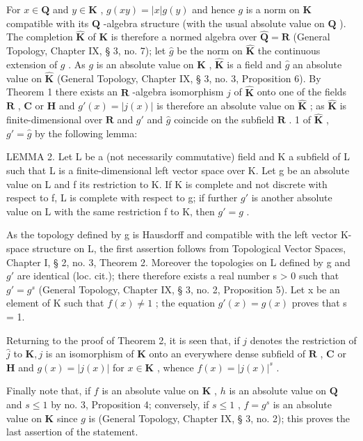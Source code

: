 For \(x \in \mathbf{Q}\) and \(y \in \mathbf{K}\) , \(g(xy) = |x|g(y)\) and hence \(g\) is a norm on \(\mathbf{K}\) compatible with its \(\mathbf{Q}\) -algebra structure (with the usual absolute value on \(\mathbf{Q}\) ). The completion \(\hat{\mathbf{K}}\) of \(\mathbf{K}\) is therefore a normed algebra over \(\hat{\mathbf{Q}} = \mathbf{R}\) (General Topology, Chapter IX, § 3, no. 7); let \(\hat{g}\) be the norm on \(\hat{\mathbf{K}}\) the continuous extension of \(g\) . As \(g\) is an absolute value on \(\mathbf{K}\) , \(\hat{\mathbf{K}}\) is a field and \(\hat{g}\) an absolute value on \(\hat{\mathbf{K}}\) (General Topology, Chapter IX, § 3, no. 3, Proposition 6). By Theorem 1 there exists an \(\mathbf{R}\) -algebra isomorphism \(j\) of \(\hat{\mathbf{K}}\) onto one of the fields \(\mathbf{R}\) , \(\mathbf{C}\) or \(\mathbf{H}\) and \(g'(x) = |j(x)|\) is therefore an absolute value on \(\hat{\mathbf{K}}\) ; as \(\hat{\mathbf{K}}\) is finite-dimensional over \(\mathbf{R}\) and \(g'\) and \(\hat{g}\) coincide on the subfield \(\mathbf{R}\) . 1 of \(\hat{\mathbf{K}}\) , \(g' = \hat{g}\) by the following lemma:

LEMMA 2. Let L be a (not necessarily commutative) field and K a subfield of L such that L is a finite-dimensional left vector space over K. Let g be an absolute value on L and f its restriction to K. If K is complete and not discrete with respect to f, L is complete with respect to g; if further \(g'\) is another absolute value on L with the same restriction f to K, then \(g' = g\) .

As the topology defined by g is Hausdorff and compatible with the left vector K-space structure on L, the first assertion follows from Topological Vector Spaces, Chapter I, § 2, no. 3, Theorem 2. Moreover the topologies on L defined by g and \(g'\) are identical (loc. cit.); there therefore exists a real number s > 0 such that \(g' = g^{s}\) (General Topology, Chapter IX, § 3, no. 2, Proposition 5). Let x be an element of K such that \(f(x) \neq 1\) ; the equation \(g'(x) = g(x)\) proves that s = 1.

Returning to the proof of Theorem 2, it is seen that, if \(j\) denotes the restriction of \(\hat{j}\) to \(\mathbf{K}, j\) is an isomorphism of \(\mathbf{K}\) onto an everywhere dense subfield of \(\mathbf{R}\) , \(\mathbf{C}\) or \(\mathbf{H}\) and \(g(x) = |j(x)|\) for \(x \in \mathbf{K}\) , whence \(f(x) = |j(x)|^s\) .

Finally note that, if \(f\) is an absolute value on \(\mathbf{K}\) , \(h\) is an absolute value on \(\mathbf{Q}\) and \(s \leqslant 1\) by no. 3, Proposition 4; conversely, if \(s \leqslant 1\) , \(f = g^s\) is an absolute value on \(\mathbf{K}\) since \(g\) is (General Topology, Chapter IX, § 3, no. 2); this proves the last assertion of the statement.

